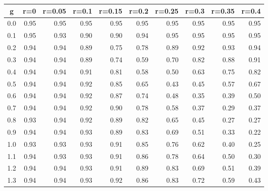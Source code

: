 %
\begin{table}[!tbp]
 \begin{center}
 \begin{tabular}{rrrrrrrrrr}\hline\hline
\multicolumn{1}{c}{g}&\multicolumn{1}{c}{r=0}&\multicolumn{1}{c}{r=0.05}&\multicolumn{1}{c}{r=0.1}&\multicolumn{1}{c}{r=0.15}&\multicolumn{1}{c}{r=0.2}&\multicolumn{1}{c}{r=0.25}&\multicolumn{1}{c}{r=0.3}&\multicolumn{1}{c}{r=0.35}&\multicolumn{1}{c}{r=0.4}\tabularnewline
\hline
0.0&0.95&0.95&0.95&0.95&0.95&0.95&0.95&0.95&0.95\tabularnewline
0.1&0.95&0.93&0.90&0.90&0.94&0.95&0.95&0.95&0.95\tabularnewline
0.2&0.94&0.94&0.89&0.75&0.78&0.89&0.92&0.93&0.94\tabularnewline
0.3&0.94&0.94&0.89&0.74&0.59&0.70&0.82&0.88&0.91\tabularnewline
0.4&0.94&0.94&0.91&0.81&0.58&0.50&0.63&0.75&0.82\tabularnewline
0.5&0.94&0.94&0.92&0.85&0.65&0.43&0.45&0.57&0.67\tabularnewline
0.6&0.94&0.94&0.92&0.87&0.74&0.48&0.35&0.39&0.50\tabularnewline
0.7&0.94&0.94&0.92&0.90&0.78&0.58&0.37&0.29&0.37\tabularnewline
0.8&0.93&0.94&0.92&0.89&0.82&0.65&0.45&0.27&0.27\tabularnewline
0.9&0.94&0.94&0.93&0.89&0.83&0.69&0.51&0.33&0.22\tabularnewline
1.0&0.93&0.93&0.93&0.91&0.85&0.76&0.62&0.40&0.25\tabularnewline
1.1&0.94&0.93&0.93&0.91&0.86&0.78&0.64&0.50&0.30\tabularnewline
1.2&0.94&0.94&0.93&0.91&0.89&0.83&0.69&0.51&0.39\tabularnewline
1.3&0.94&0.94&0.93&0.92&0.86&0.83&0.72&0.59&0.43\tabularnewline
\hline
\end{tabular}

\end{center}

\end{table}

